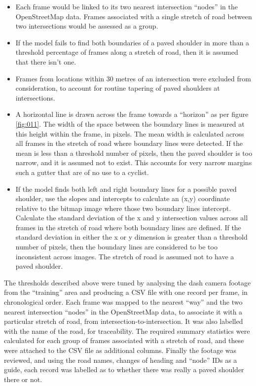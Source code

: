 \documentclass[11pt,twoside]{report}
\begin{document}
\begin{itemize}
\item{Each frame would be linked to its two nearest intersection ``nodes'' in the OpenStreetMap data.  Frames associated with a single stretch of road between two intersections would be assessed as a group.}
\item{If the model fails to find both boundaries of a paved shoulder in more than a threshold percentage of frames along a stretch of road, then it is assumed that there isn't one.}
\item{Frames from locations within 30 metres of an intersection were excluded from consideration, to account for routine tapering of paved shoulders at intersections.}
\item{A horizontal line is drawn across the frame towards a ``horizon'' as per figure \ref{fig:011}.  The width of the space between the boundary lines is measured at this height within the frame, in pixels.  The mean width is calculated across all frames in the stretch of road where boundary lines were detected.  If the mean is less than a threshold number of pixels, then the paved shoulder is too narrow, and it is assumed not to exist.  This accounts for very narrow margins such a gutter that are of no use to a cyclist.}
\item{If the model finds both left and right boundary lines for a possible paved shoulder, use the slopes and intercepts to calculate an (x,y) coordinate relative to the bitmap image where those two boundary lines intercept.  Calculate the standard deviation of the x and y intersection values across all frames in the stretch of road where both boundary lines are defined.  If the standard deviation in either the x or y dimension is greater than a threshold number of pixels, then the boundary lines are considered to be too inconsistent across images.  The stretch of road is assumed not to have a paved shoulder.}
\end{itemize}

The thresholds described above were tuned by analysing the dash camera footage from the ``training'' area and producing a CSV file with one record per frame, in chronological order.  Each frame was mapped to the nearest ``way'' and the two nearest intersection ``nodes'' in the OpenStreetMap data, to associate it with a particular stretch of road, from intersection-to-intersection.  It was also labelled with the name of the road, for traceability.  The required summary statistics were calculated for each group of frames associated with a stretch of road, and these were attached to the CSV file as additional columns.  Finally the footage was reviewed, and using the road names, changes of heading and ``node'' IDs as a guide, each record was labelled as to whether there was really a paved shoulder there or not.
\end{document}

